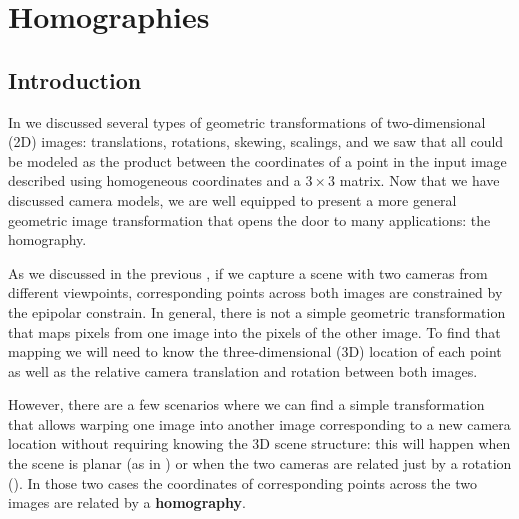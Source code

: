 \chapter{Homographies}
\label{chapter:homography}






\section{Introduction}




In \chap{\ref{chapter:geometry_homogeneous}} we discussed several types of geometric transformations of two-dimensional (2D) images: translations, rotations, skewing, scalings, and we saw that all could be modeled as the product between the coordinates of a point in the input image described using homogeneous coordinates and a $3 \times 3$ matrix.  Now that we have discussed camera models, we are well equipped to present a more general geometric image transformation that opens the door to many applications: the homography. 

As we discussed in the previous \chap{\ref{chap:stereo_vision}}, if we capture a scene with two cameras from different viewpoints, corresponding points across both images are constrained by the epipolar constrain. In general, there is not a simple geometric transformation that maps pixels from one image into the pixels of the other image. To find that mapping we will need to know the three-dimensional (3D) location of each point as well as the relative camera translation and rotation between both images. %

However, there are a few scenarios where we can find a simple transformation that allows warping one image into another image corresponding to a new camera location without requiring knowing the 3D scene structure: this will happen when the scene is planar (as in \fig{\ref{fig:illustration_homography}}) or when the two cameras are related just by a rotation (\fig{\ref{fig:rotation_homography}}). In those two cases the coordinates of corresponding points across the two images are related by a {\bf homography}.


